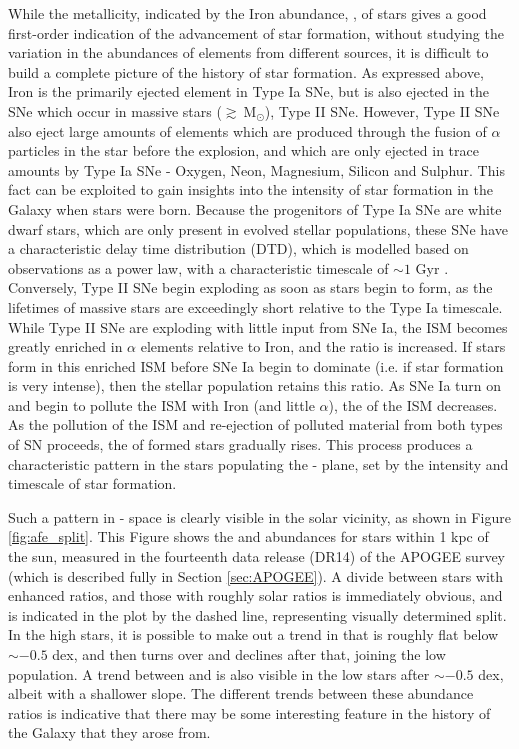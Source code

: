 While the metallicity, indicated by the Iron abundance, \feh{}, of stars gives a good first-order indication of the advancement of star formation, without studying the variation in the abundances of elements from different sources, it is difficult to build a complete picture of the history of star formation. As expressed above, Iron is the primarily ejected element in Type Ia SNe, but is also ejected in the SNe which occur in massive stars ($\gtrsim \ \mathrm{M_{\odot}}$), Type II SNe. However, Type II SNe also eject large amounts of elements which are produced through the fusion of $\alpha$ particles in the star before the explosion, and which are only ejected in trace amounts by Type Ia SNe - Oxygen, Neon, Magnesium, Silicon and Sulphur. This fact can be exploited to gain insights into the intensity of star formation in the Galaxy when stars were born. Because the progenitors of Type Ia SNe are white dwarf stars, which are only present in evolved stellar populations, these SNe have a characteristic delay time distribution (DTD), which is modelled based on observations as a power law, with a characteristic timescale of $\sim 1$ Gyr \citep[e.g.][]{2012MNRAS.426.3282M,2014ApJ...783...28G}. Conversely, Type II SNe begin exploding as soon as stars begin to form, as the lifetimes of massive stars are exceedingly short relative to the Type Ia timescale. While Type II SNe are exploding with little input from SNe Ia, the ISM becomes greatly enriched in $\alpha$ elements relative to Iron, and the \afe{} ratio is increased. If stars form in this enriched ISM before SNe Ia begin to dominate (i.e. if star formation is very intense), then the stellar population retains this \afe{} ratio. As SNe Ia turn on and begin to pollute the ISM with Iron (and little $\alpha$), the \afe{} of the ISM decreases. As the pollution of the ISM and re-ejection of polluted material from both types of SN proceeds, the \feh{} of formed stars gradually rises. This process produces a characteristic pattern in the stars populating the \feh{}-\afe{} plane, set by the intensity and timescale of star formation.

Such a pattern in \feh{}-\afe{} space is clearly visible in the solar vicinity, as shown in Figure \ref{fig:afe_split}. This Figure shows the \afe{} and \feh{} abundances for stars within 1 kpc of the sun, measured in the fourteenth data release (DR14) of the APOGEE survey (which is described fully in Section \ref{sec:APOGEE}). A divide between stars with enhanced \afe{} ratios, and those with roughly solar ratios is immediately obvious, and is indicated in the plot by the dashed line, representing visually determined split. In the high \afe{} stars, it is possible to make out a trend in \afe{} that is roughly flat below \feh{}$\sim -0.5$ dex, and then turns over and declines after that, joining the low \afe{} population. A trend between \afe{} and \feh{} is also visible in the low \afe{} stars after \feh{}$\sim -0.5$ dex, albeit with a shallower slope. The different trends between these abundance ratios is indicative that there may be some interesting feature in the history of the Galaxy that they arose from.

